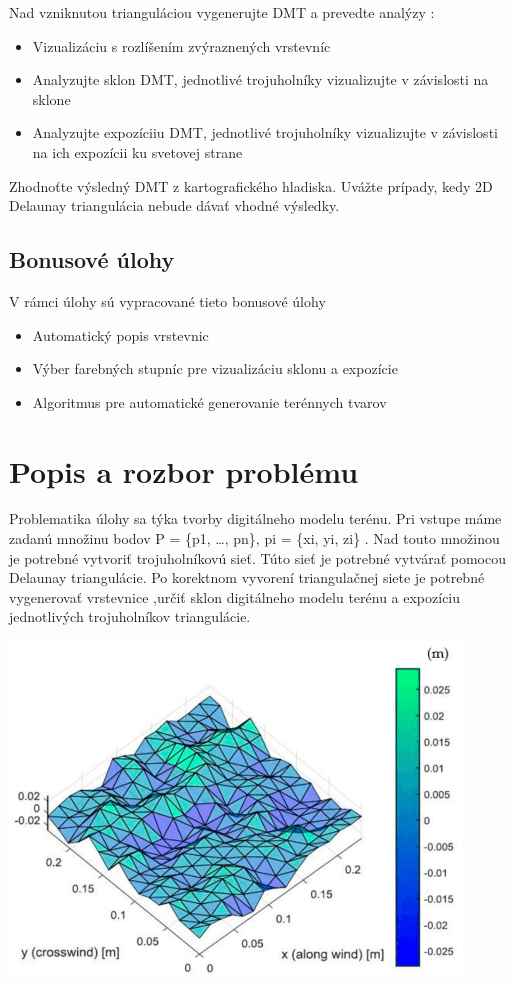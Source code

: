 \documentclass[12pt]{article}
\begin{document}
Nad vzniknutou trianguláciou vygenerujte DMT a prevedte analýzy :

\begin{itemize}
\item Vizualizáciu s rozlíšením zvýraznených vrstevníc 
\item Analyzujte sklon DMT, jednotlivé trojuholníky vizualizujte v závislosti na sklone
\item Analyzujte expozíciiu DMT, jednotlivé trojuholníky vizualizujte v závislosti na ich expozícii ku svetovej strane 
\end{itemize}
		
Zhodnoťte výsledný DMT z kartografického hladiska. Uvážte prípady, kedy 2D Delaunay triangulácia nebude dávať vhodné výsledky.

\subsection{Bonusové úlohy}
V rámci úlohy sú vypracované tieto bonusové úlohy

\begin{itemize}
\item Automatický popis vrstevnic
\item Výber farebných stupníc pre vizualizáciu sklonu a expozície
\item Algoritmus pre automatické generovanie terénnych tvarov
\end{itemize}
\clearpage 
\section{Popis a rozbor problému}
Problematika úlohy sa týka tvorby digitálneho modelu terénu. Pri vstupe máme zadanú množinu bodov P = \{p1, …, pn\},  p{i} = \{x{i}, y{i}, z{i}\} . Nad touto množinou je potrebné vytvoriť trojuholníkovú sieť. Túto sieť je potrebné vytvárať pomocou Delaunay triangulácie. Po korektnom vyvorení triangulačnej siete je potrebné vygenerovať vrstevnice ,určiť sklon digitálneho modelu terénu a expozíciu jednotlivých trojuholníkov triangulácie.

\begin{center}
   \includegraphics[width=12cm]{./img/Delaunay_DTM.png}
\end{center}
\end{document}
